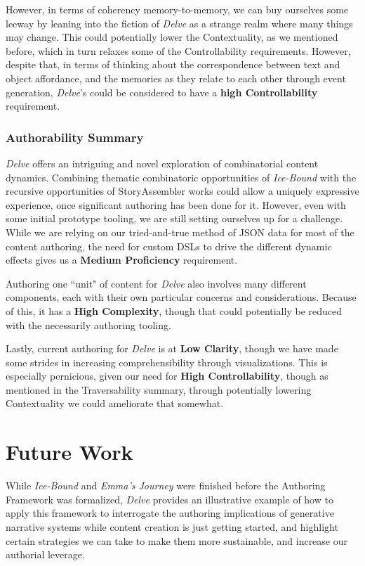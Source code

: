 However, in terms of coherency memory-to-memory, we can buy ourselves some leeway by leaning into the fiction of \textit{Delve} as a strange realm where many things may change. This could potentially lower the Contextuality, as we mentioned before, which in turn relaxes some of the Controllability requirements. However, despite that, in terms of thinking about the correspondence between text and object affordance, and the memories as they relate to each other through event generation, \textit{Delve}'s could be considered to have a \textbf{high Controllability} requirement.

\subsubsection{Authorability Summary}\label{subsubsec:delve-authorability-summary}

\textit{Delve} offers an intriguing and novel exploration of combinatorial content dynamics. Combining thematic combinatoric opportunities of \textit{Ice-Bound} with the recursive opportunities of StoryAssembler works could allow a uniquely expressive experience, once significant authoring has been done for it. However, even with some initial prototype tooling, we are still setting ourselves up for a challenge. While we are relying on our tried-and-true method of JSON data for most of the content authoring, the need for custom DSLs to drive the different dynamic effects gives us a \textbf{Medium Proficiency} requirement.

Authoring one ``unit" of content for \textit{Delve} also involves many different components, each with their own particular concerns and considerations. Because of this, it has a \textbf{High Complexity}, though that could potentially be reduced with the necessarily authoring tooling.

Lastly, current authoring for \textit{Delve} is at \textbf{Low Clarity}, though we have made some strides in increasing comprehensibility through visualizations. This is especially pernicious, given our need for \textbf{High Controllability}, though as mentioned in the Traversability summary, through potentially lowering Contextuality we could ameliorate that somewhat.

\section{Future Work}\label{sec:delve-future-work}

While \textit{Ice-Bound} and \textit{Emma's Journey} were finished before the Authoring Framework was formalized, \textit{Delve} provides an illustrative example of how to apply this framework to interrogate the authoring implications of generative narrative systems while content creation is just getting started, and highlight certain strategies we can take to make them more sustainable, and increase our authorial leverage.

